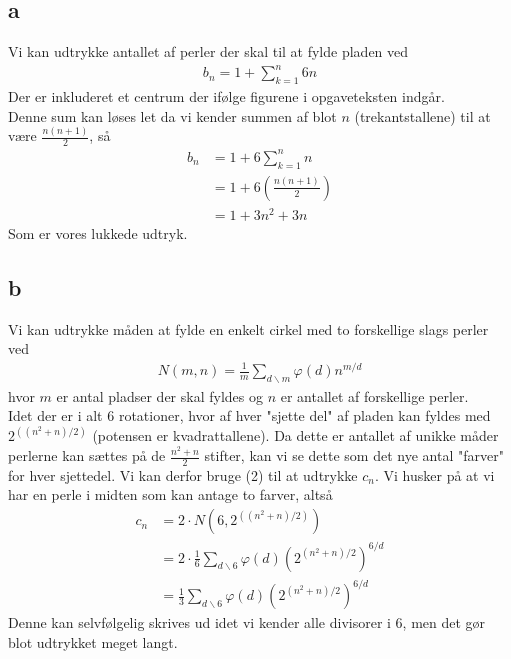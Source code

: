 \documentclass[12pt]{article}
\begin{document}
\subsection*{a}
Vi kan udtrykke antallet af perler der skal til at fylde pladen ved
\begin{align*}
b_n=1+\sum_{k=1}^n 6n
\end{align*}
Der er inkluderet et centrum der ifølge figurene i opgaveteksten indgår.\\
Denne sum kan løses let da vi kender summen af blot $n$ (trekantstallene) til at være $\frac{n(n+1)}{2}$, så
\begin{align*}
b_n &= 1+6\sum_{k=1}^n n \\
&=1+6\left(\frac{n(n+1)}{2}\right) \\
&=1+3n^2+3n
\end{align*}
Som er vores lukkede udtryk.

\subsection*{b}
Vi kan udtrykke måden at fylde en enkelt cirkel med to forskellige slags perler ved
\begin{align}
N(m,n)=\frac{1}{m}\sum_{d \backslash m}\varphi (d)n^{m/d}
\end{align}
hvor $m$ er antal pladser der skal fyldes og $n$ er antallet af forskellige perler. \\
Idet der er i alt $6$ rotationer, hvor af hver "sjette del" af pladen kan fyldes med $2^{((n^2+n)/2)}$ (potensen er kvadrattallene). Da dette er antallet af unikke måder perlerne kan sættes på de $\frac{n^2+n}{2}$ stifter, kan vi se dette som det nye antal "farver" for hver sjettedel. Vi kan derfor bruge (2) til at udtrykke $c_n$. Vi husker på at vi har en perle i midten som kan antage to farver, altså
\begin{align*}
c_n&=2\cdot N(6,2^{((n^2+n)/2)}) \\
&=2\cdot\frac{1}{6}\sum_{d\backslash 6} \varphi(d)\left( 2^{(n^2+n)/2}\right)^{6/d} \\
&=\frac{1}{3}\sum_{d\backslash 6} \varphi(d)\left( 2^{(n^2+n)/2}\right)^{6/d} 
\end{align*}
Denne kan selvfølgelig skrives ud idet vi kender alle divisorer i $6$, men det gør blot udtrykket meget langt.
\end{document}

